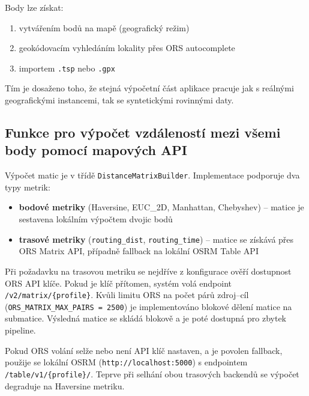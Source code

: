 Body lze získat:
\begin{enumerate}
    \item vytvářením bodů na mapě (geografický režim)
    \item geokódovacím vyhledáním lokality přes ORS autocomplete
    \item importem \texttt{.tsp} nebo \texttt{.gpx}
\end{enumerate}

Tím je dosaženo toho, že stejná výpočetní část aplikace pracuje jak s reálnými geografickými instancemi, tak se syntetickými rovinnými daty.

\subsection{Funkce pro výpočet vzdáleností mezi všemi body pomocí mapových API}
Výpočet matic je v třídě \texttt{DistanceMatrixBuilder}. Implementace podporuje dva typy metrik:
\begin{itemize}
    \item \textbf{bodové metriky} (Haversine, EUC\_2D, Manhattan, Chebyshev) -- matice je sestavena lokálním výpočtem dvojic bodů
    \item \textbf{trasové metriky} (\texttt{routing\_dist}, \texttt{routing\_time}) -- matice se získává přes ORS Matrix API, případně fallback na lokální OSRM Table API
\end{itemize}

Při požadavku na trasovou metriku se nejdříve z konfigurace ověří dostupnost ORS API klíče. Pokud je klíč přítomen, systém volá endpoint \texttt{/v2/matrix/\{profile\}}. Kvůli limitu ORS na počet párů zdroj--cíl (\texttt{ORS\_MATRIX\_MAX\_PAIRS = 2500}) je implementováno blokové dělení matice na submatice. Výsledná matice se skládá blokově a je poté dostupná pro zbytek pipeline.

Pokud ORS volání selže nebo není API klíč nastaven, a je povolen fallback, použije se lokální OSRM (\texttt{http://localhost:5000}) s endpointem \texttt{/table/v1/\{profile\}/}. Teprve při selhání obou trasových backendů se výpočet degraduje na Haversine metriku.



